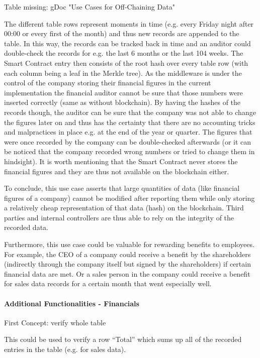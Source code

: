 Table missing: gDoc "Use Cases for Off-Chaining Data"

The different table rows represent moments in time (e.g. every Friday night after 00:00 or every first of the month) and thus new records are appended to the table. In this way, the records can be tracked back in time and an auditor could double-check the records for e.g. the last 6 months or the last 104 weeks. The Smart Contract entry then consists of the root hash over every table row (with each column being a leaf in the Merkle tree).
As the middleware is under the control of the company storing their financial figures in the current implementation the financial auditor cannot be sure that those numbers were inserted correctly (same as without blockchain). By having the hashes of the records though, the auditor can be sure that the company was not able to change the figures later on and thus has the certainty that there are no accounting tricks and malpractices in place e.g. at the end of the year or quarter. The figures that were once recorded by the company can be double-checked afterwards (or it can be noticed that the company recorded wrong numbers or tried to change them in hindsight). It is worth mentioning that the Smart Contract never stores the financial figures and they are thus not available on the blockchain either.

To conclude, this use case asserts that large quantities of data (like financial figures of a company) cannot be modified after reporting them while only storing a relatively cheap representation of that data (hash) on the blockchain. Third parties and internal controllers are thus able to rely on the integrity of the recorded data.

Furthermore, this use case could be valuable for rewarding benefits to employees. For example, the CEO of a company could receive a benefit by the shareholders (indirectly through the company itself but signed by the shareholders) if certain financial data are met. Or a sales person in the company could receive a benefit for sales data records for a certain month that went especially well.

\paragraph{Additional Functionalities - Financials}
First Concept: verify whole table

This could be used to verify a row “Total” which sums up all of the recorded entries in the table (e.g. for sales data).

